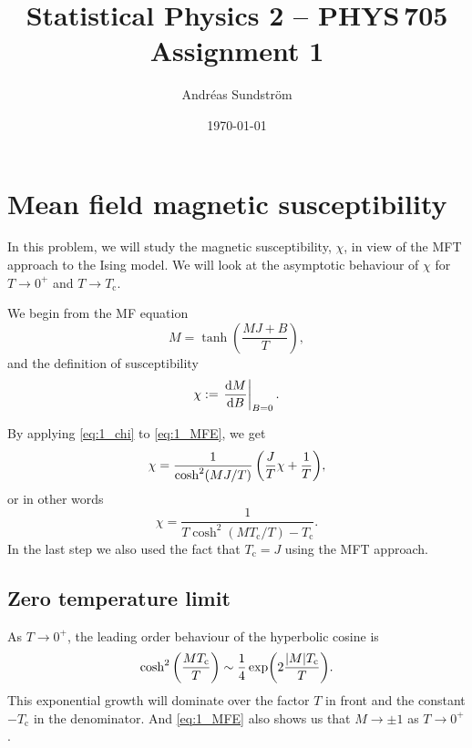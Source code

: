 \documentclass[11pt,letter, swedish, english
]{article}
\newcommand{\Tc}{\ensuremath{T_{\text{c}}}}
\begin{document}




\title{Statistical Physics 2 -- PHYS\,705 \\
Assignment 1}
\author{Andréas Sundström}
\date{\today}

\maketitle


\section{Mean field magnetic susceptibility}
\renewcommand{\thesubsection}{\arabic{section} (\roman{subsection})}

In this problem, we will study the magnetic susceptibility, $\chi$, in
view of the MFT approach to the Ising model. We will look at the
asymptotic behaviour of $\chi$ for $T\to0^+$ and $T\to\Tc$.

We begin from the MF equation
\begin{equation}\label{eq:1_MFE}
M=\tanh(\frac{MJ + B}{T}),
\end{equation}
and the definition of susceptibility
\begin{equation}\label{eq:1_chi}
\chi:=\eval{\dv{M}{B}}_{B=0}.
\end{equation}

By applying \eqref{eq:1_chi} to \eqref{eq:1_MFE}, we get
\begin{equation}
\chi=\frac{1}{\cosh^2(MJ/T)}\, 
\qty(\frac{J}{T}\chi+\frac{1}{T}),
\end{equation}
or in other words
\begin{equation}\label{eq:1_chi_exact}
\chi=\frac{1}{T\cosh^2(M\Tc/T)-\Tc}.
\end{equation}
In the last step we also used the fact that $\Tc=J$ using the MFT approach.

\subsection{Zero temperature limit}
As $T\to0^+$, the leading order behaviour of the hyperbolic cosine is
\begin{equation}
\cosh^2\qty(\frac{M\Tc}{T})\sim \frac{1}{4}\exp(2\frac{\abs{M}\Tc}{T}).
\end{equation}
This exponential growth will dominate over the factor $T$ in
front and the constant $-\Tc$ in the denominator. And \eqref{eq:1_MFE}
also shows us that $M\to\pm1$ as $T\to0^+$. 
\end{document}
